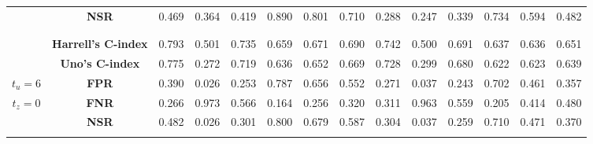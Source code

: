 \begin{table}[!htbp]
\begin{tabular}{c|c|cccccc|cccccc}
 & {\bf NSR} & 0.469 & 0.364 & 0.419 & 0.890 & 0.801 & 0.710 & 0.288 & 0.247 & 0.339 & 0.734 & 0.594 & 0.482 \\
& & & & & & & & & & & & & \\
\hline
& & & & & & & & & & & & & \\
 & {\bf Harrell’s C-index} & 0.793 & 0.501 & 0.735 & 0.659 & 0.671 & 0.690 & 0.742 & 0.500 & 0.691 & 0.637 & 0.636 & 0.651 \\
 & {\bf Uno's C-index} & 0.775 & 0.272 & 0.719 & 0.636 & 0.652 & 0.669 & 0.728 & 0.299 & 0.680 & 0.622 & 0.623 & 0.639 \\
$t_u=6$ & {\bf FPR} & 0.390 & 0.026 & 0.253 & 0.787 & 0.656 & 0.552 & 0.271 & 0.037 & 0.243 & 0.702 & 0.461 & 0.357 \\
$t_z=0$ & {\bf FNR} & 0.266 & 0.973 & 0.566 & 0.164 & 0.256 & 0.320 & 0.311 & 0.963 & 0.559 & 0.205 & 0.414 & 0.480 \\
 & {\bf NSR} & 0.482 & 0.026 & 0.301 & 0.800 & 0.679 & 0.587 & 0.304 & 0.037 & 0.259 & 0.710 & 0.471 & 0.370 \\
& & & & & & & & & & & & & \\
\hline
\end{tabular}
\end{table}
